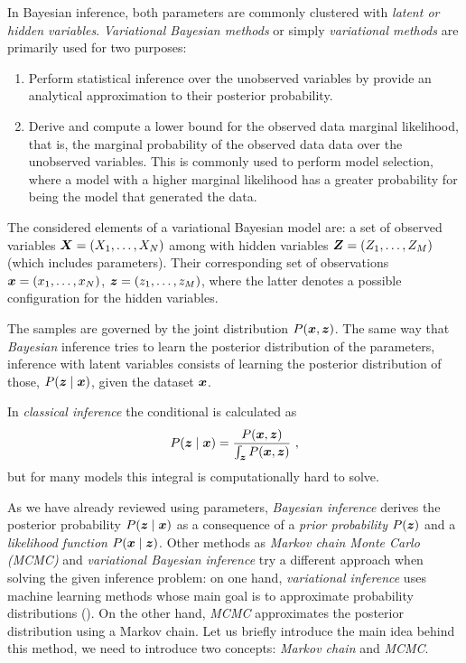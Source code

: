 
In Bayesian inference, both parameters are commonly clustered with \emph{latent or hidden variables}. \emph{Variational Bayesian methods} or simply \emph{variational methods} are primarily used for two purposes:

 \begin{enumerate}  \setlength{\itemsep}{1pt}
   \item Perform statistical inference over the unobserved variables by provide an analytical approximation to their posterior probability.
   \item Derive and compute a lower bound for the observed data marginal likelihood, that is, the marginal probability of the observed data data over the unobserved variables. This is commonly used to perform model selection, where a model with a higher marginal likelihood has a greater probability for being the model that generated the data.
 \end{enumerate}

 The considered elements of a variational Bayesian model are: a set of observed variables \(\bm{X} = (X_{1},\dots,X_{N})\) among with hidden variables \(\bm{Z} = (Z_{1},\dots,Z_{M})\) (which includes parameters). Their corresponding set of observations \(\bm{x} = (x_{1},\dots, x_{N})\),  \(\bm{z} = (z_{1}, \dots, z_{M})\), where the latter denotes a possible configuration for the hidden variables.

The samples are governed by the joint distribution \(P(\bm{x}, \bm{z})\). The same way that \emph{Bayesian} inference tries to learn the posterior distribution of the parameters, inference with latent variables consists of learning the posterior distribution of those, \(P(\bm{z} \mid \bm{x})\), given the dataset \(\bm{x}\).

In \emph{classical inference} the conditional is calculated as
\[
  P(\bm{z} \mid \bm{x}) = \frac{P(\bm{x}, \bm{z})}{\int_{\bm{z}} P(\bm{x},\bm{z})}\ ,
\]
but for many models this integral is computationally hard to solve.

As we have already reviewed using parameters, \emph{Bayesian inference} derives the posterior probability \(P(\bm{z} \mid \bm{x})\) as a consequence of a \emph{prior probability} \(P(\bm{z})\) and a \emph{likelihood function} \(P(\bm{x} \mid \bm{z})\). Other methods as \emph{Markov chain Monte Carlo (MCMC)} and \emph{variational Bayesian inference} try a different approach when solving the given inference problem: on one hand, \emph{variational inference} uses machine learning methods whose main goal is to approximate probability distributions (\cite{jordan1999introduction, wainwright}). On the other hand, \emph{MCMC} approximates the posterior distribution using a Markov chain. Let us briefly introduce the main idea behind this method, we need to introduce two concepts: \emph{Markov chain} and \emph{MCMC}.

